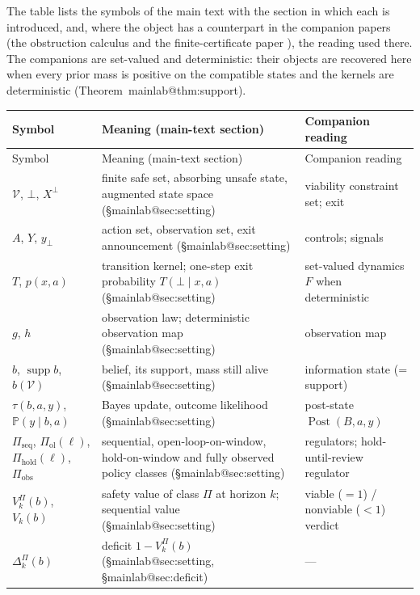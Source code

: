 \documentclass[11pt,a4paper]{article}
\makeatletter
\theoremstyle{plain}
\theoremstyle{definition}
\theoremstyle{remark}
\newcommand{\Prob}{\mathbb{P}}
\newcommand{\calV}{\mathcal{V}}
\newcommand{\supp}{\operatorname{supp}}
\newcommand{\Post}{\operatorname{Post}}
\newcommand{\hold}{\mathrm{hold}}
\newcommand{\ol}{\mathrm{ol}}
\newcommand{\seq}{\mathrm{seq}}
\newcommand{\obs}{\mathrm{obs}}
\newcommand{\mref}[1]{\csname mainlab@#1\endcsname}
\makeatother
\begin{document}
The table lists the symbols of the main text with the section in which each is introduced, and, where the object has a counterpart in the companion papers (the obstruction calculus \cite{Abaee2026calc} and the finite-certificate paper \cite{Abaee2026cert}), the reading used there. The companions are set-valued and deterministic: their objects are recovered here when every prior mass is positive on the compatible states and the kernels are deterministic (Theorem~\mref{thm:support}).

{\footnotesize
\begin{longtable}{@{}>{\raggedright\arraybackslash}p{}>{\raggedright\arraybackslash}p{}>{\raggedright\arraybackslash}p{}@{}}
\toprule
Symbol & Meaning (main-text section) & Companion reading\\
\midrule
\endfirsthead
\toprule
Symbol & Meaning (main-text section) & Companion reading\\
\midrule
\endhead
\bottomrule
\endlastfoot
$\calV$, $\bot$, $X^{\bot}$ & finite safe set, absorbing unsafe state, augmented state space (\S\mref{sec:setting}) & viability constraint set; exit\\
$A$, $Y$, $y_{\bot}$ & action set, observation set, exit announcement (\S\mref{sec:setting}) & controls; signals\\
$T$, $p(x,a)$ & transition kernel; one-step exit probability $T(\bot\mid x,a)$ (\S\mref{sec:setting}) & set-valued dynamics $F$ when deterministic\\
$g$, $h$ & observation law; deterministic observation map (\S\mref{sec:setting}) & observation map\\
$b$, $\supp b$, $b(\calV)$ & belief, its support, mass still alive (\S\mref{sec:setting}) & information state (= support)\\
$\tau(b,a,y)$, $\Prob(y\mid b,a)$ & Bayes update, outcome likelihood (\S\mref{sec:setting}) & post-state $\Post(B,a,y)$\\
$\Pi_{\seq}$, $\Pi_{\ol}(\ell)$, $\Pi_{\hold}(\ell)$, $\Pi_{\obs}$ & sequential, open-loop-on-window, hold-on-window and fully observed policy classes (\S\mref{sec:setting}) & regulators; hold-until-review regulator\\
$V^{\Pi}_k(b)$, $V_k(b)$ & safety value of class $\Pi$ at horizon $k$; sequential value (\S\mref{sec:setting}) & viable ($=1$) / nonviable ($<1$) verdict\\
$\Delta^{\Pi}_k(b)$ & deficit $1-V^{\Pi}_k(b)$ (\S\mref{sec:setting}, \S\mref{sec:deficit}) & ---\\

\end{longtable}}
\end{document}
